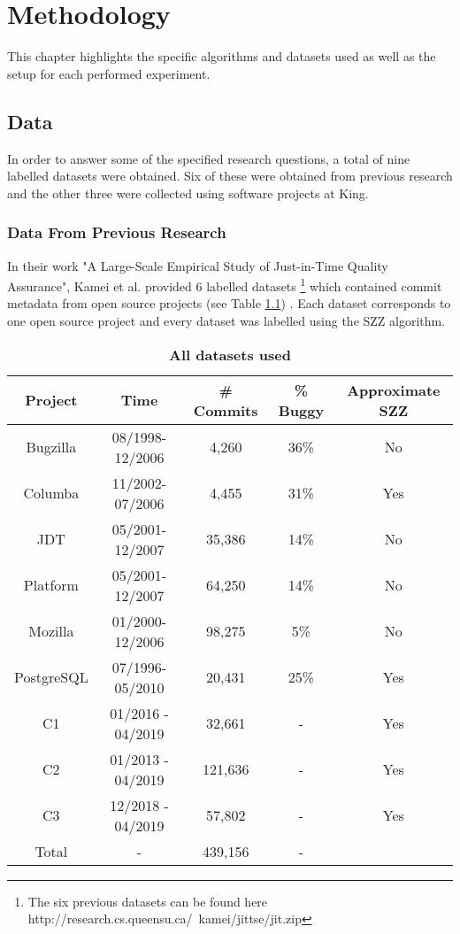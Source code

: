 \documentclass[../main.tex]{subfiles}
\begin{document}
\chapter{Methodology} \label{chapter:methodology}

This chapter highlights the specific algorithms and datasets used as well as the setup for each performed experiment.

\section{Data} 

In order to answer some of the specified research questions, a total of nine labelled datasets were obtained. Six of these were obtained from previous research \cite{kamei2013large} and the other three were collected using software projects at King.

\subsection{Data From Previous Research}

In their work "A Large-Scale Empirical Study of Just-in-Time Quality Assurance", Kamei et al. provided 6 labelled datasets \footnote{The six previous datasets can be found here http://research.cs.queensu.ca/~kamei/jittse/jit.zip} which contained commit metadata from open source projects (see Table \ref{table:allData}) \cite{kamei2013large}. Each dataset corresponds to one open source project and every dataset was labelled using the SZZ algorithm.

\vspace{10pt}

\begin{table}[h]
    \centering
    \begin{tabular}{|c c c c c|} 
    \hline
    \textbf{Project} & \textbf{Time} & \textbf{\# Commits} & \textbf{\% Buggy} & \textbf{Approximate SZZ}\\ 
    \hline\hline
     Bugzilla & 08/1998-12/2006 & 4,260 & 36\% & No\\ 
     \hline
    Columba & 11/2002-07/2006 & 4,455 & 31\% & Yes\\
    \hline
    JDT & 05/2001-12/2007 & 35,386 & 14\% & No\\
    \hline
    Platform & 05/2001-12/2007 & 64,250 & 14\% & No\\
    \hline
    Mozilla & 01/2000-12/2006 & 98,275 & 5\% & No\\
    \hline
    PostgreSQL & 07/1996-05/2010 & 20,431 & 25\% & Yes\\
    \hline
    C1 & 01/2016 - 04/2019 & 32,661 & - & Yes\\ %
    \hline
    C2 & 01/2013 - 04/2019 & 121,636 & - & Yes\\ %
    \hline
    C3 & 12/2018 - 04/2019 & 57,802 & - &Yes\\ %
    \hline
    Total & - & 439,156 & - & \\ %
    \hline
    \end{tabular}
    \caption{\textbf{All datasets used}}
    \label{table:allData}
\end{table}
\end{document}
